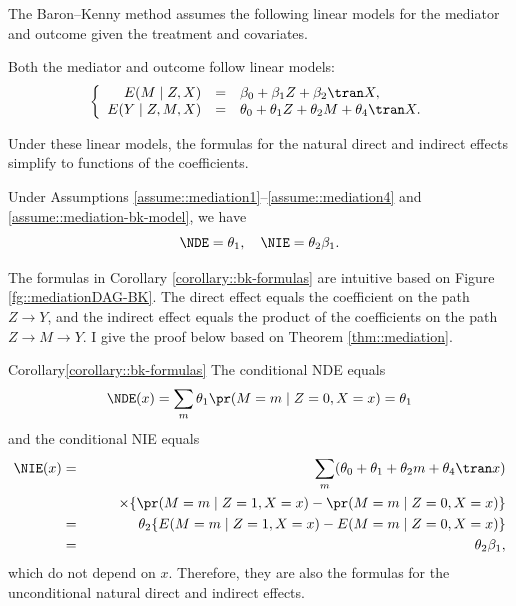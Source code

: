 The Baron--Kenny method assumes the following linear models for the mediator and outcome given the treatment and covariates.

\begin{assumption}
\label{assume::mediation-bk-model}
Both the mediator and outcome follow linear models:
$$
\left\{\begin{array}{rcl}
E(M \mid Z, X) &=&  \beta_0 + \beta_1 Z + \beta_2\tran X, \\
E(Y\mid Z,M,X) &=& \theta_0 + \theta_1 Z + \theta_2 M + \theta_4\tran X.
\end{array}\right.
$$
\end{assumption}


 
Under these linear models,  the formulas for the natural direct and indirect effects simplify to functions of the coefficients. 

\begin{corollary}
\label{corollary::bk-formulas}
Under Assumptions \ref{assume::mediation1}--\ref{assume::mediation4} and \ref{assume::mediation-bk-model},  we have 
$$
\NDE = \theta_1
,\quad 
\NIE = \theta_2 \beta_1 .
$$
\end{corollary}


The formulas in Corollary \ref{corollary::bk-formulas} are intuitive based on Figure \ref{fg::mediationDAG-BK}. The direct effect equals the coefficient on the path $Z\rightarrow Y$, and the indirect effect equals the product of the coefficients on the path $Z\rightarrow M\rightarrow Y$. I give the proof below based on Theorem \ref{thm::mediation}. 


\begin{myproof}{Corollary}{\ref{corollary::bk-formulas}}
The conditional NDE equals 
$$
\NDE(x)  
= \sum_m  \theta_1  \pr(M=m \mid Z=0, X=x) = \theta_1
$$
and the conditional NIE equals 
\begin{eqnarray*}
\NIE(x) &=&  \sum_m  (\theta_0 + \theta_1  + \theta_2 m + \theta_4\tran x )\\
&&  \qquad  \times  \{ \pr(M=m \mid Z=1, X=x) -  \pr(M=m \mid Z=0, X=x) \} \\
&=& \theta_2 \{ E(M=m \mid Z=1, X=x) -  E(M=m \mid Z=0, X=x) \} \\
&=&  \theta_2 \beta_1 ,
\end{eqnarray*}
which do not depend on $x$. Therefore, they are also the formulas for the unconditional natural direct and indirect effects.
\end{myproof}


